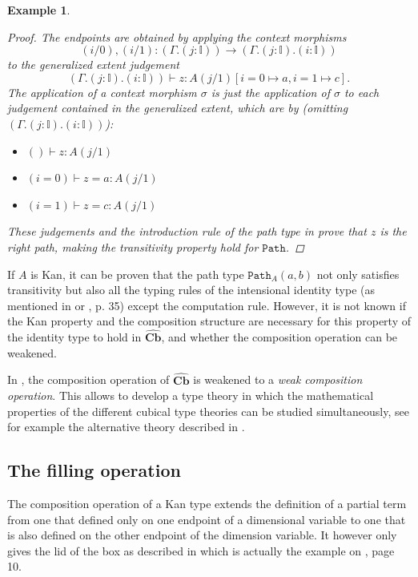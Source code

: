 \documentclass[12pt,a4paper,twoside,xetex]{book} %
\newcommand{\keyword}[1]{\emph{#1}\index{#1}}
\newtheorem{example}[theorem]{Example}
\newcommand{\psh}[1]{\widehat{#1}}
\newcommand{\op}[1]{\mathtt{#1}}
\newcommand{\cube}[0]{\textbf{Cb}}
\begin{document}
\begin{example}
\begin{proof}
The endpoints are obtained by applying the context morphisms $$(i/0),(i/1): 
(\Gamma . ( j : \mathbb{I})) \rightarrow (\Gamma. ( j : \mathbb{I}) . ( i :  
\mathbb{I}))$$ to the generalized extent judgement $$(\Gamma. ( j : \mathbb{I}) 
. ( i :  \mathbb{I})) \vdash z : A(j/1) [i =0 \mapsto a, i=1 \mapsto c].$$ The 
application of a context morphism $\sigma$  is just the application of $\sigma$ 
to each judgement contained in the generalized extent, which are by 
(omitting $(\Gamma. ( j : \mathbb{I}) . ( i :  \mathbb{I}))$):

\begin{itemize}
\item $ () \vdash z: A(j/1)$
\item $ (i = 0) \vdash z = a : A(j/1)$
\item $ (i = 1) \vdash z = c : A(j/1)$
\end{itemize}

These judgements and the introduction rule of the path type in  prove that $z$ is the right path, making the transitivity 
property hold for $\op{Path}$. 

\end{proof} 

\end{example}

If $A$ is Kan, it can be proven that the path type $\op{Path}_A(a,b)$ not only  
satisfies transitivity but also all the typing rules of  the intensional 
identity type (as mentioned in  or
\cite{Orton2019}, p. 35) except the computation rule. However, it is not known if the Kan property and the composition structure are necessary for this property of the identity type to hold in $\psh{\cube}$, and 
whether the composition operation can be weakened. 

In \cite{Cavallo2019}, the composition operation of $\psh{\cube}$ is weakened to a \keyword{weak composition operation}. This allows to develop a type theory 
in which the mathematical properties of the different cubical type theories can 
be studied simultaneously, see for example the alternative theory described in 
.


\subsection{The filling operation}\label{filling}

The composition operation of a Kan type extends the definition of a partial 
term from one that defined only on one  endpoint  of a dimensional variable to 
one that is also defined on the other endpoint of the dimension variable. It 
however only gives the lid of the box as described in 
 which is actually the example  on \cite{Coquand2018}, 
page 10. 
\end{document}
